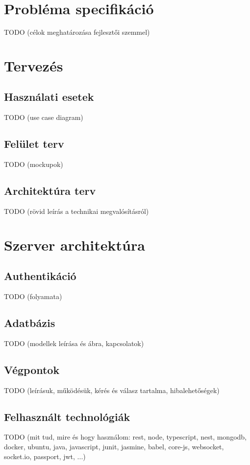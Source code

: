 \documentclass{elteikthesis}
\begin{document}
	\section{Probléma specifikáció}
	TODO (célok meghatározása fejlesztői szemmel)

	\section{Tervezés}
	\subsection{Használati esetek}
	TODO (use case diagram)
	
	\subsection{Felület terv}
	TODO (mockupok)
	
	\subsection{Architektúra terv}
	TODO (rövid leírás a technikai megvalósításról)
	
	\section{Szerver architektúra}
	\subsection{Authentikáció}
	TODO (folyamata)
	
	\subsection{Adatbázis}
	TODO (modellek leírása és ábra, kapcsolatok)
	
	\subsection{Végpontok}
	TODO (leírásuk, működésük, kérés és válasz tartalma, hibalehetőségek)
	
	\subsection{Felhasznált technológiák}
	TODO (mit tud, mire és hogy használom: rest, node, typescript, nest, mongodb, docker, ubuntu, java, javascript, junit, jasmine, babel, core-js, websocket, socket.io, passport, jwt, ...)
	
\end{document}
